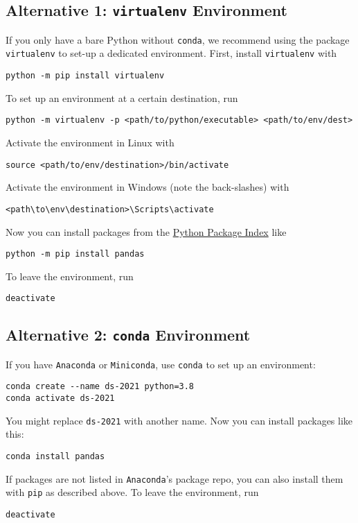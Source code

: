 \documentclass[12pt]{article}
\newcommand{\code}[1]{{\color{kitgreen}\texttt{#1}}}
\begin{document}
\subsection{Alternative 1: \code{virtualenv} Environment}

If you only have a bare Python without \code{conda}, we recommend using the package \code{virtualenv} to set-up a dedicated environment.
First, install \code{virtualenv} with
%
\begin{lstlisting}[style=cmdblock]
python -m pip install virtualenv
\end{lstlisting}
%
To set up an environment at a certain destination, run
%
\begin{lstlisting}[style=cmdblock]
python -m virtualenv -p <path/to/python/executable> <path/to/env/dest>
\end{lstlisting}
%
Activate the environment in Linux with
%
\begin{lstlisting}[style=cmdblock]
source <path/to/env/destination>/bin/activate
\end{lstlisting}
%
Activate the environment in Windows (note the back-slashes) with
%
\begin{lstlisting}[style=cmdblock]
<path\to\env\destination>\Scripts\activate
\end{lstlisting}
%
Now you can install packages from the \href{https://pypi.org/}{Python Package Index} like
%
\begin{lstlisting}[style=cmdblock]
python -m pip install pandas
\end{lstlisting}
%
To leave the environment, run
%
\begin{lstlisting}[style=cmdblock]
deactivate
\end{lstlisting}

\subsection{Alternative 2: \code{conda} Environment}

If you have \code{Anaconda} or \code{Miniconda}, use \code{conda} to set up an environment:
%
\begin{lstlisting}[style=cmdblock]
conda create --name ds-2021 python=3.8
conda activate ds-2021
\end{lstlisting}
%
You might replace \code{ds-2021} with another name.
Now you can install packages like this:
%
\begin{lstlisting}[style=cmdblock]
conda install pandas
\end{lstlisting}
%
If packages are not listed in \code{Anaconda}'s package repo, you can also install them with \code{pip} as described above.
To leave the environment, run
%
\begin{lstlisting}[style=cmdblock]
deactivate
\end{lstlisting}
\end{document}
